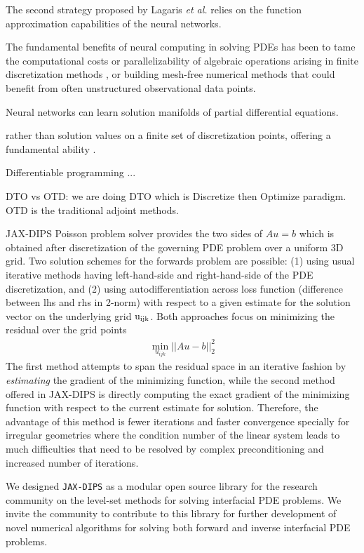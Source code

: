 \documentclass{elsarticle}
\begin{document}
The second strategy proposed by Lagaris \textit{et al.} \cite{lagaris1998artificial} relies on the function approximation capabilities of the neural networks.

The fundamental benefits of neural computing in solving PDEs has been to tame the computational costs or parallelizability of algebraic operations arising in finite discretization methods \cite{wang1990structured}, or building mesh-free numerical methods that could benefit from often unstructured observational data points.




Neural networks can learn solution manifolds of partial differential equations.
 

rather than solution values on a finite set of discretization points, offering a fundamental ability . 


Differentiable programming ...

DTO vs OTD: we are doing DTO which is Discretize then Optimize paradigm. OTD is the traditional adjoint methods.

JAX-DIPS Poisson problem solver provides the two sides of $A u =b$ which is obtained after discretization of the governing PDE problem over a uniform 3D grid. Two solution schemes for the forwards problem are possible: (1) using usual iterative methods having left-hand-side and right-hand-side of the PDE discretization, and (2) using autodifferentiation across loss function (difference between lhs and rhs in 2-norm) with respect to a given estimate for the solution vector on the underlying grid $\rm u_{ijk}$. Both approaches focus on minimizing the residual over the grid points
\begin{align*}
	\min_{u_{ijk}} \vert\vert Au -b \vert \vert^2_2
\end{align*}
The first method attempts to span the residual space in an iterative fashion by \textit{estimating} the gradient of the minimizing function, while the second method offered in JAX-DIPS is directly computing the exact gradient of the minimizing function with respect to the current estimate for solution. Therefore, the advantage of this method is fewer iterations and faster convergence specially for irregular geometries where the condition number of the linear system leads to much difficulties that need to be resolved by complex preconditioning and increased number of iterations.



We designed \texttt{JAX-DIPS} as a modular open source library for the research community on the level-set methods for solving interfacial PDE problems. We invite the community to contribute to this library for further development of novel numerical algorithms for solving both forward and inverse interfacial PDE problems.
\end{document}
